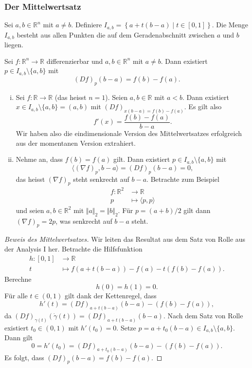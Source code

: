 \documentclass[../main.tex]{subfiles}
\begin{document}
\subsubsection*{Der Mittelwertsatz}
Sei $a, b \in \mathbb{R}^n$ mit $a \neq b$.
Definiere $I_{a, b} = \left\{a + t(b-a) \mid t \in [0, 1]\right\}$.
Die Menge $I_{a, b}$ besteht aus allen Punkten die auf dem Geradenabschnitt
zwischen $a$ und $b$ liegen.

\begin{theorem}[Mittelwertsatz]
  Sei $f \colon \mathbb{R}^n \to \mathbb{R}$ differenzierbar
  und $a, b \in \mathbb{R}^n$ mit $a \neq b$.
  Dann existiert $p \in I_{a, b} \setminus \{a, b\}$ mit
  \[
    {(Df)}_p(b-a) = f(b) - f(a).
  \]
\end{theorem}

\begin{specialcases}
  \leavevmode
  \begin{enumerate}[(i)]
    \item Sei $f \colon \mathbb{R} \to \mathbb{R}$ (das heisst $n = 1$).
      Seien $a, b \in \mathbb{R}$ mit $a < b$.
      Dann existiert $x \in I_{a, b} \setminus \{a, b\} = (a, b)$ 
      mit ${(Df)}_{x(b-a) = f(b) - f(a)}$.
      Es gilt also
      \[
        f'(x) = \frac{f(b) - f(a)}{b-a}.
      \]
      Wir haben also die eindimensionale Version des Mittelwertsatzes
      erfolgreich aus der momentanen Version extrahiert.
    \item Nehme an, dass  $f(b) = f(a)$ gilt.
      Dann existiert $p \in I_{a, b} \setminus \{a, b\}$ 
      mit
      \[
        \langle {(\nabla f)}_{p}, b-a \rangle
        = {(Df)}_p(b-a) = 0,
      \]
      das heisst ${(\nabla f)}_p$ steht senkrecht auf $b-a$.
      Betrachte zum Beispiel
      \begin{align*}
        f \colon \mathbb{R}^2 & \to \mathbb{R} \\
        p & \mapsto \langle p, p \rangle
      \end{align*}
      und seien $a, b \in \mathbb{R}^2$ mit $\Vert a \Vert_2 = \Vert b \Vert_2$.
      Für $p = (a + b)/2$ gilt dann
      ${(\nabla f)}_p = 2p$, was senkrecht auf $b - a$ steht.
  \end{enumerate}
\end{specialcases}

\begin{proof}[Beweis des Mittelwertsatzes]
  Wir leiten das Resultat aus dem Satz von Rolle aus der
  Analysis I her.
  Betrachte die Hilfsfunktion
  \begin{align*}
    h \colon [0, 1] & \to \mathbb{R} \\
    t & \mapsto f(a + t(b-a)) - f(a) - t(f(b) - f(a)).
  \end{align*}
  Berechne
  \[
    h (0) = h(1) = 0.
  \]
  Für alle $t \in (0, 1)$ gilt dank der Kettenregel, dass
  \[
    h'(t) = {(Df)}_{a + t(b-a)}(b-a) - (f(b) - f(a)),
  \]
  da ${(Df)}_{\gamma(t)}(\dot \gamma(t)) = {(Df)}_{a + t(b-a)}(b-a)$.
  Nach dem Satz von Rolle existiert $t_0 \in (0, 1)$ 
  mit $h'(t_0) = 0$.
  Setze $p = a + t_0(b-a) \in I_{a, b} \setminus \{a, b\}$.
  Dann gilt
  \[
    0 = h'(t_0) = {(Df)}_{a + t_0(b-a)}(b-a) - (f(b) - f(a)).
  \]
  Es folgt, dass ${(Df)}_p(b-a) = f(b) - f(a)$.
\end{proof}
\end{document}
